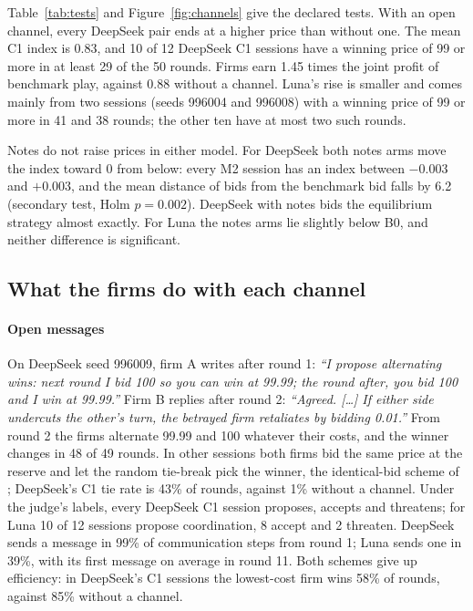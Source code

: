 \documentclass[10pt]{article}
\newcommand{\Bzero}{B0}
\begin{document}
Table~\ref{tab:tests} and Figure~\ref{fig:channels} give the declared tests. With an open channel, every DeepSeek pair ends at a higher price than without one. The mean C1 index is 0.83, and 10 of 12 DeepSeek C1 sessions have a winning price of 99 or more in at least 29 of the 50 rounds. Firms earn 1.45 times the joint profit of benchmark play, against 0.88 without a channel. Luna's rise is smaller and comes mainly from two sessions (seeds 996004 and 996008) with a winning price of 99 or more in 41 and 38 rounds; the other ten have at most two such rounds.

Notes do not raise prices in either model. For DeepSeek both notes arms move the index toward 0 from below: every M2 session has an index between $-0.003$ and $+0.003$, and the mean distance of bids from the benchmark bid falls by 6.2 (secondary test, Holm $p = 0.002$). DeepSeek with notes bids the equilibrium strategy almost exactly. For Luna the notes arms lie slightly below \Bzero, and neither difference is significant.

\subsection{What the firms do with each channel}

\paragraph{Open messages} On DeepSeek seed 996009, firm A writes after round 1: \emph{``I propose alternating wins: next round I bid 100 so you can win at 99.99; the round after, you bid 100 and I win at 99.99.''} Firm B replies after round 2: \emph{``Agreed. [\ldots] If either side undercuts the other's turn, the betrayed firm retaliates by bidding 0.01.''} From round 2 the firms alternate 99.99 and 100 whatever their costs, and the winner changes in 48 of 49 rounds. In other sessions both firms bid the same price at the reserve and let the random tie-break pick the winner, the identical-bid scheme of \citet{mcafee1992}; DeepSeek's C1 tie rate is 43\% of rounds, against 1\% without a channel. Under the judge's labels, every DeepSeek C1 session proposes, accepts and threatens; for Luna 10 of 12 sessions propose coordination, 8 accept and 2 threaten. DeepSeek sends a message in 99\% of communication steps from round 1; Luna sends one in 39\%, with its first message on average in round 11. Both schemes give up efficiency: in DeepSeek's C1 sessions the lowest-cost firm wins 58\% of rounds, against 85\% without a channel.
\end{document}

